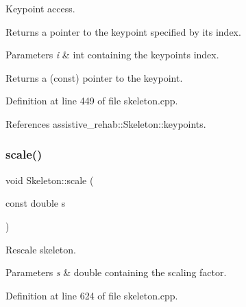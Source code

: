 Keypoint access. 

Returns a pointer to the keypoint specified by its index. 
\begin{DoxyParams}{Parameters}
{\em i} & int containing the keypoint\textquotesingle{}s index. \\
\hline
\end{DoxyParams}
\begin{DoxyReturn}{Returns}
a (const) pointer to the keypoint. 
\end{DoxyReturn}


Definition at line 449 of file skeleton.\+cpp.


\begin{DoxyCode}{0}

\end{DoxyCode}


References assistive\+\_\+rehab\+::\+Skeleton\+::keypoints.

\mbox{\label{classassistive__rehab_1_1Skeleton_a21fded128e2240e4dd507030b7386670}} 
\subsubsection{\texorpdfstring{scale()}{scale()}}
{\footnotesize\ttfamily void Skeleton\+::scale (\begin{DoxyParamCaption}\item[{const double}]{s }\end{DoxyParamCaption})\hspace{0.3cm}{\ttfamily [inherited]}}



Rescale skeleton. 


\begin{DoxyParams}{Parameters}
{\em s} & double containing the scaling factor. \\
\hline
\end{DoxyParams}


Definition at line 624 of file skeleton.\+cpp.


\begin{DoxyCode}{0}

\end{DoxyCode}


